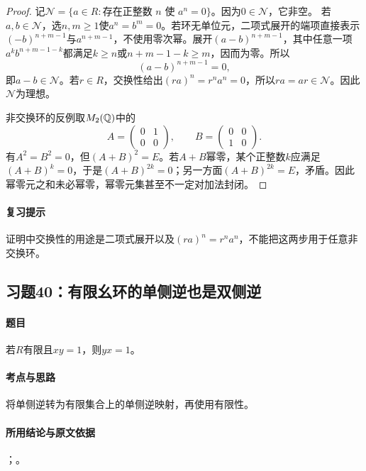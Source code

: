 
\begin{proof}
记$\mathcal N=\{a\in R:\text{存在正整数 }n\text{ 使 }a^n=0\}$。因为$0\in\mathcal N$，它非空。
若$a,b\in\mathcal N$，选$n,m\geq1$使$a^n=b^m=0$。若环无单位元，二项式展开的端项直接表示$(-b)^{n+m-1}$与$a^{n+m-1}$，不使用零次幂。展开$(a-b)^{n+m-1}$，其中任意一项$a^k b^{n+m-1-k}$都满足$k\geq n$或$n+m-1-k\geq m$，因而为零。所以
\[
(a-b)^{n+m-1}=0,
\]
即$a-b\in\mathcal N$。若$r\in R$，交换性给出$(ra)^n=r^na^n=0$，所以$ra=ar\in\mathcal N$。因此$\mathcal N$为理想。

非交换环的反例取$M_2(\mathbb Q)$中的
\[
A=\begin{pmatrix}0&1\\0&0\end{pmatrix},\qquad
B=\begin{pmatrix}0&0\\1&0\end{pmatrix}.
\]
有$A^2=B^2=0$，但$(A+B)^2=E$。若$A+B$幂零，某个正整数$k$应满足$(A+B)^k=0$，于是$(A+B)^{2k}=0$；另一方面$(A+B)^{2k}=E$，矛盾。因此幂零元之和未必幂零，幂零元集甚至不一定对加法封闭。
\end{proof}

\paragraph{复习提示}
证明中交换性的用途是二项式展开以及$(ra)^n=r^na^n$，不能把这两步用于任意非交换环。


\subsection{习题40：\texorpdfstring{有限幺环的单侧逆也是双侧逆}{有限幺环的单侧逆也是双侧逆}}
\label{ex:1:40}

\paragraph{题目}
若$R$有限且$xy=1$，则$yx=1$。

\paragraph{考点与思路}
将单侧逆转为有限集合上的单侧逆映射，再使用有限性。

\paragraph{所用结论与原文依据}
；。


